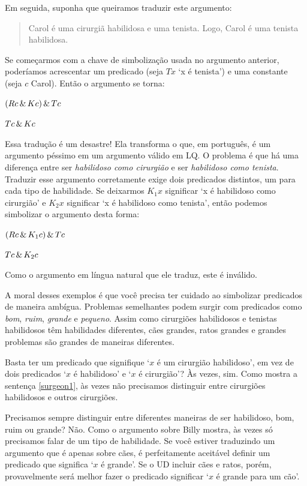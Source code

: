 Em seguida, suponha que queiramos traduzir este argumento:
\begin{quote}
\label{surgeon3}
Carol é uma cirurgiã habilidosa e uma tenista. Logo, Carol é uma tenista habilidosa.
\end{quote}
Se começarmos com a chave de simbolização usada no argumento anterior, poderíamos acrescentar um predicado (seja $Tx$ `x é tenista') e uma constante (seja $c$ Carol). Então o argumento se torna:
\begin{earg}
\item[] $(Rc \,\&\, Kc) \,\&\, Tc$
\item[\therefore] $Tc \,\&\, Kc$
\end{earg}
Essa tradução é um desastre! Ela transforma o que, em português, é um argumento péssimo em um argumento válido em LQ. O problema é que há uma diferença entre ser \emph{habilidoso como cirurgião} e ser \emph{habilidoso como tenista}. Traduzir esse argumento corretamente exige dois predicados distintos, um para cada tipo de habilidade. Se deixarmos $K_1x$ significar `x é habilidoso como cirurgião' e $K_2x$ significar `x é habilidoso como tenista', então podemos simbolizar o argumento desta forma:
\begin{earg}
\label{surgeon3correct}
\item[] $(Rc \,\&\, K_1c) \,\&\, Tc$
\item[\therefore] $Tc \,\&\, K_2c$
\end{earg}
Como o argumento em língua natural que ele traduz, este é inválido.

A moral desses exemplos é que você precisa ter cuidado ao simbolizar predicados de maneira ambígua. Problemas semelhantes podem surgir com predicados como \emph{bom}, \emph{ruim}, \emph{grande} e \emph{pequeno}. Assim como cirurgiões habilidosos e tenistas habilidosos têm habilidades diferentes, cães grandes, ratos grandes e grandes problemas são grandes de maneiras diferentes.

Basta ter um predicado que signifique `$x$ é um cirurgião habilidoso', em vez de dois predicados `$x$ é habilidoso' e `$x$ é cirurgião'? Às vezes, sim. Como mostra a sentença \ref{surgeon1}, às vezes não precisamos distinguir entre cirurgiões habilidosos e outros cirurgiões.

Precisamos sempre distinguir entre diferentes maneiras de ser habilidoso, bom, ruim ou grande? Não. Como o argumento sobre Billy mostra, às vezes só precisamos falar de um tipo de habilidade. Se você estiver traduzindo um argumento que é apenas sobre cães, é perfeitamente aceitável definir um predicado que significa `$x$ é grande'. Se o UD incluir cães e ratos, porém, provavelmente será melhor fazer o predicado significar `$x$ é grande para um cão'.


